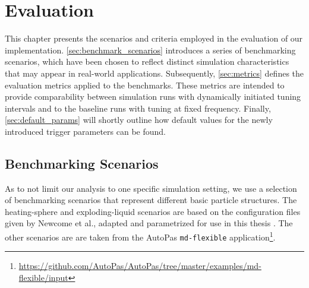 \chapter[Evaluation]{Evaluation}
\label{cp:evaluation}

{
	\parindent0pt
	This chapter presents the scenarios and criteria employed in the evaluation of our implementation. \autoref{sec:benchmark_scenarios} introduces a series of benchmarking scenarios, which have been chosen to reflect distinct simulation characteristics that may appear in real-world applications. Subsequently, \autoref{sec:metrics} defines the evaluation metrics applied to the benchmarks. These metrics are intended to provide comparability between simulation runs with dynamically initiated tuning intervals and to the baseline runs with tuning at fixed frequency.
	Finally, \autoref{sec:default_params} will shortly outline how default values for the newly introduced trigger parameters can be found.
}


\section{Benchmarking Scenarios}
\label{sec:benchmark_scenarios}
As to not limit our analysis to one specific simulation setting, we use a selection of benchmarking scenarios that represent different basic particle structures.
The heating-sphere and exploding-liquid scenarios are based on the configuration files given by Newcome et al., adapted and parametrized for use in this thesis \cite{Newcome2025}.
The other scenarios are are taken from the AutoPas \texttt{md-flexible} application\footnote{\href{https://github.com/AutoPas/AutoPas/tree/master/examples/md-flexible/input}{https://github.com/AutoPas/AutoPas/tree/master/examples/md-flexible/input}}.



\newcommand{\fastcolorbar}{%
	\centering
	\begin{tikzpicture}
		\pgfplotscolorbardrawstandalone[
			colorbar,
			colormap name=fast,
			point meta min=0,
			point meta max=50,
			colorbar style={
					height=3cm,
					ytick={0,10,...,50},
					tick align=outside,
					tick pos=right,
				},
		]
	\end{tikzpicture}

	\begin{tikzpicture}
		\node[anchor=north, align=center] at (0,0) {\si{F^{*}}};
	\end{tikzpicture}
}

